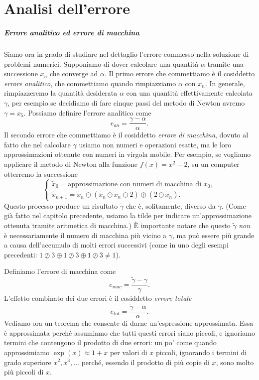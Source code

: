 \documentclass[a4paper]{report}
\theoremstyle{definiton}
\theoremstyle{remark}
\begin{document}
\chapter{Analisi dell'errore}

\paragraph{Errore analitico ed errore di macchina} Siamo ora in grado di studiare nel dettaglio l'errore commesso nella soluzione di problemi numerici. Supponiamo di dover calcolare una quantità $\alpha$ tramite una successione $x_n$ che converge ad $\alpha$. Il primo errore che commettiamo è il cosiddetto \emph{errore analitico}, che commettiamo quando rimpiazziamo $\alpha$ con $x_n$. In generale, rimpiazzeremo la quantità desiderata $\alpha$ con una quantità effettivamente calcolata $\gamma$, per esempio se decidiamo di fare cinque passi del metodo di Newton avremo $\gamma=x_5$. Possiamo definire l'errore analitico come
\begin{equation} \label{ean}
    e_{an} = \frac{\gamma - \alpha}{\alpha}.    
\end{equation}
Il secondo errore che commettiamo è il cosiddetto \emph{errore di macchina}, dovuto al fatto che nel calcolare $\gamma$ usiamo non numeri e operazioni esatte, ma le loro approssimazioni ottenute con numeri in virgola mobile. Per esempio, se vogliamo applicare il metodo di Newton alla funzione $f(x) = x^2 - 2$, su un computer otterremo la successione
\[
\begin{cases}
    \tilde{x}_0 = \text{approssimazione con numeri di macchina di $x_0$},\\
    \tilde{x}_{n+1} = \tilde{x}_n \ominus (\tilde{x}_n\odot \tilde{x}_n \ominus 2) \oslash (2\odot \tilde{x}_n).
\end{cases}
\]
Questo processo produce un risultato $\tilde{\gamma}$ che è, solitamente, diverso da $\gamma$. (Come già fatto nel capitolo precedente, usiamo la tilde per indicare un'approssimazione ottenuta tramite aritmetica di macchina.) È importante notare che questo $\tilde{\gamma}$ \emph{non} è necessariamente il numero di macchina più vicino a $\gamma$, ma può essere più grande a causa dell'accumulo di molti errori successivi (come in uno degli esempi precedenti: $1\oslash 3 \oplus 1\oslash 3 \oplus 1\oslash 3 \neq 1$). 

Definiamo l'errore di macchina come
\[
e_{mac} = \frac{\tilde{\gamma} - \gamma}{\gamma}.
\]
L'effetto combinato dei due errori è il cosiddetto \emph{errore totale}
\[
e_{tot} = \frac{\tilde{\gamma} - \alpha}{\alpha}.
\]
Vediamo ora un teorema che consente di darne un'espressione approssimata. Essa è approssimata perché assumiamo che tutti questi errori siano piccoli, e ignoriamo termini che contengono il prodotto di due errori: un po' come quando approssimiamo $\exp(x) \approx 1 + x$ per valori di $x$ piccoli, ignorando i termini di grado superiore $x^2, x^3, \dots$ perché, essendo il prodotto di più copie di $x$, sono molto più piccoli di $x$.
\end{document}
